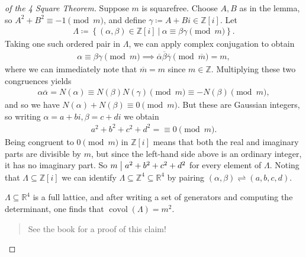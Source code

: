 \begin{proof}[of the 4 Square Theorem]

Suppose \(m\) is squarefree. Choose \(A, B\) as in the lemma, so
\(A^2 + B^2 \equiv -1 \pmod m\), and define
\(\gamma \coloneqq A+ Bi \in {\mathbb{Z}}[i]\). Let
\begin{align*} \Lambda \coloneqq\left\{{ (\alpha, \beta) \in {\mathbb{Z}}[i] {~\mathrel{\Big|}~}\alpha\equiv \beta \gamma \pmod m }\right\} .\end{align*}
Taking one such ordered pair in \(\Lambda\), we can apply complex
conjugation to obtain
\begin{align*}
\alpha\equiv \beta \gamma\pmod m \implies {\overline{{ \alpha}}} {\overline{{ \beta}}} {\overline{{ \gamma}}} \pmod{\overline{{m}}} = m
,\end{align*}
where we can immediately note that \({\overline{{m}}} = m\) since
\(m\in {\mathbb{Z}}\). Multiplying these two congruences yields
\begin{align*}
\alpha{\overline{{\alpha}}} 
= N( \alpha) 
\equiv N( \beta) N( \gamma) \pmod m
\equiv - N( \beta) \pmod m
,\end{align*}
and so we have \(N( \alpha) + N( \beta) \equiv 0 \pmod m\). But these
are Gaussian integers, so writing \(\alpha = a + bi, \beta = c + di\) we
obtain
\begin{align*}
a^2 + b^2 + c^2 + d^2 = \equiv 0 \pmod m
.\end{align*}
Being congruent to \(0\pmod m\) in \({\mathbb{Z}}[i]\) means that both
the real and imaginary parts are divisible by \(m\), but since the
left-hand side above is an ordinary integer, it has no imaginary part.
So \(m \bigm|a^2 + b^2 + c^2 + d^2\) for every element of \(\Lambda\).
Noting that \(\Lambda \subseteq {\mathbb{Z}}[i]\) we can identify
\(\Lambda \subseteq {\mathbb{Z}}^4 \subseteq {\mathbb{R}}^4\) by pairing
\(( \alpha, \beta) \rightleftharpoons(a,b,c,d)\).

\begin{claim}

\(\Lambda\subseteq {\mathbb{R}}^4\) is a full lattice, and after writing
a set of generators and computing the determinant, one finds that
\(\operatorname{covol}( \Lambda) = m^2\).

\end{claim}

\begin{quote}
See the book for a proof of this claim!
\end{quote}


\end{proof}
